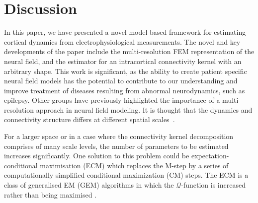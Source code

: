 \documentclass[review,authoryear,3p]{elsarticle}
\newcommand{\dean}[1]{\textcolor{green}{#1}}
\begin{document}

\section{Discussion}
In this paper, we have presented a novel model-based framework for estimating cortical dynamics from electrophysiological measurements. The novel and key developments of the paper include the multi-resolution FEM representation of the neural field, and the estimator for an intracortical connectivity kernel with an arbitrary shape. This work is significant, as the ability to create patient specific neural field models has the potential to contribute to our understanding and improve treatment of diseases resulting from abnormal neurodynamics, such as epilepsy. Other groups have previously highlighted the importance of a multi-resolution approach in neural field modeling. It is thought that the dynamics and connectivity structure differs at different spatial scales~\citep{Qubbaj2009,Breakspear2005}. %

For a larger space or in a case where the connectivity kernel decomposition comprises of  many scale levels, the number of parameters to be estimated increases significantly. One solution to this problem could be expectation-conditional maximisation (ECM) \citep{Meng1993,Meng1994} which replaces the M-step by a series of computationally simplified conditional maximization (CM) steps. The ECM is a class of generalised EM (GEM)  algorithms in which the $\mathcal{Q}$-function is increased rather than being maximised \citep{Fessler1994}. 
\end{document}
